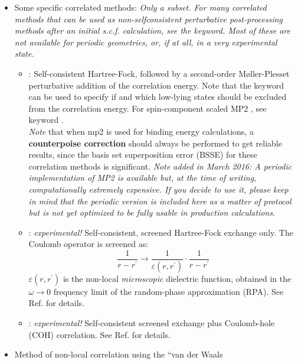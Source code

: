 \begin{itemize}
  \item Some specific correlated methods: \emph{Only a subset. For
    many correlated methods that can be used as non-selfconsistent
    perturbative post-processing methods after an initial
    s.c.f. calculation, see the 
    keyword. Most of these are not available for periodic
    geometries, or, if at all, in a very experimental state.}
    \begin{itemize}
      \item {} : Self-consistent Hartree-Fock, followed by a
        second-order M{\o}ller-Plesset perturbative addition of the
        correlation energy. Note that the  keyword can
        be used to specify if and which low-lying states should be excluded
        from the correlation energy. For spin-component scaled MP2
        \cite{Grimme03}, see keyword . \\[1.0ex]
        \emph{Note} that when mp2 is used for binding energy calculations,
        a \textbf{counterpoise correction} should always be performed to get reliable
        results, since the basis set superposition error (BSSE) for these correlation
        methods is significant. \emph{Note added in March 2016: A periodic
        implementation of MP2 is available but, at the time of writing,
        computationally extremely expensive. If you decide to use it,
        please keep in mind that the periodic version is included here
        as a matter of protocol but is not yet optimized to be fully
        usable in production calculations.}
      \item {} : \emph{experimental!} Self-consistent, screened
        Hartree-Fock exchange only. The Coulomb operator is screened as:
        \begin{equation}
          \frac{1}{r-r^\prime} \rightarrow \frac{1}{\varepsilon(r,r^\prime)}
          \cdot \frac{1}{r-r^\prime}
        \end{equation}
        $\varepsilon(r,r^\prime)$ is the non-local \emph{microscopic}
        dielectric function, obtained in the $\omega\rightarrow$0 frequency
        limit of the random-phase approximation (RPA). See Ref. \cite{Hedin65} for
        details.
      \item {} : \emph{experimental!} Self-consistent screened
        exchange plus Coulomb-hole (COH) correlation. See Ref. \cite{Hedin65} for
        details.
    \end{itemize}
  \item Method of non-local correlation using the ``van der Waals

\end{itemize}

